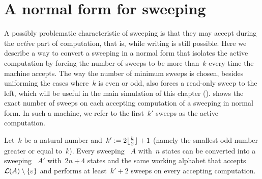 \section{A normal form for sweeping \texorpdfstring{\kDLAs}{k-DLAs}}\label{sec:equiv-swep-dla}
A possibly problematic characteristic of sweeping \kDLAs is that they may accept during the \emph{active} part of computation, that is, while writing is still possible.
Here we describe a way to convert a sweeping \kDLA in a normal form that isolates the active computation by forcing the number of sweeps to be more than~$k$ every time the machine accepts.
The way the number of minimum sweeps is chosen, besides uniforming the cases where~$k$ is even or odd, also forces a read-only sweep to the left, which will be useful in the main simulation of this chapter ().
 shows the exact number of sweeps on each accepting computation of a sweeping \kDLA in normal form.
In such a machine, we refer to the first~$k'$ sweeps as the active computation.
\begin{thrm}\label{thm:equiv-swep-dla}
	Let~$k$ be a natural number and~$k':=2\lfloor \frac{k}{2} \rfloor+1$ (namely the smallest odd number greater or equal to~$k$).
	Every sweeping \kDLA~$A$ with~$n$ states can be converted into a sweeping \kDLA~$A'$ with~$2n+4$ states and the same working alphabet that accepts~$\mathcal L(A)\setminus\{\varepsilon\}$ and performs at least~$k'+2$ sweeps on every accepting computation.
\end{thrm}
